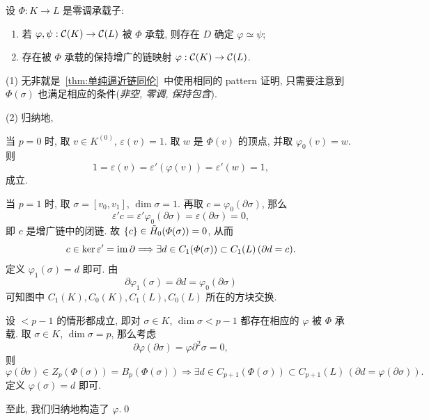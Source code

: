 \begin{Proposition}[零调承载子定理]\label{prop:零调承载子定理}
	设 $ \varPhi : K\to L $ 是零调承载子:
	\begin{enumerate}
		\item 若 $ \varphi,\psi : \mathcal{C}(K)\to\mathcal{C}(L) $ 被 $ \varPhi $ 承载, 则存在 $ D $ 确定 $ \varphi\simeq\psi $;
		\item 存在被 $ \varPhi $ 承载的保持增广的链映射 $ \varphi : \mathcal{C}(K)\to \mathcal{C}(L) $.
	\end{enumerate}
\end{Proposition}
\begin{Proof}
	(1) 无非就是~\ref{thm:单纯逼近链同伦}~中使用相同的 pattern 证明, 只需要注意到 $ \varPhi(\sigma) $ 也满足相应的条件(\textit{非空, 零调, 保持包含}).

	(2) 归纳地, 
	\begin{center}
	\end{center}
	当 $ p=0 $ 时, 取 $ v\in K^{(0)} $, $ \varepsilon(v)=1 $. 取 $ w $ 是 $ \varPhi(v) $ 的顶点, 并取 $ \varphi_0(v)=w $. 则
	\[
		1=\varepsilon(v)=\varepsilon'(\varphi(v))=\varepsilon'(w)=1,
	\]
	成立.

	当 $ p=1 $ 时, 取 $ \sigma=[v_0,v_1] $, $ \dim\sigma=1 $. 再取 $ c=\varphi_0(\partial\sigma) $, 那么
	\[
		\varepsilon'c=\varepsilon'\varphi_0(\partial\sigma)=\varepsilon(\partial\sigma)=0,
	\]
	即 $ c $ 是增广链中的闭链. 故 $ \left\{ c \right\}\in\tilde{H}_0(\varPhi(\sigma))=0 $, 从而
	\[
		c\in\ker\varepsilon'=\mathrm{im}\,\partial\Longrightarrow\exists d\in C_1(\varPhi(\sigma))\subset C_1(L)\,(\partial d=c).
	\]
	定义 $ \varphi_1(\sigma)=d $ 即可. 由
	\[
		\partial\varphi_1(\sigma)=\partial d=\varphi_0(\partial\sigma)
	\]
	可知图中 $ C_1(K), C_0(K), C_1(L), C_0(L) $ 所在的方块交换.

	设 $ <p-1 $ 的情形都成立, 即对 $ \sigma\in K $, $ \dim\sigma<p-1 $ 都存在相应的 $ \varphi $ 被 $ \varPhi $ 承载. 取 $ \sigma\in K $, $ \dim\sigma=p $, 那么考虑
	\[
		\partial\varphi(\partial\sigma)=\varphi\partial^2\sigma=0,
	\]
	则
	\[
		\varphi(\partial\sigma)\in Z_p(\varPhi(\sigma))=B_p(\varPhi(\sigma))\Longrightarrow\exists d\in C_{p+1}(\varPhi(\sigma))\subset C_{p+1}(L)\,(\partial d=\varphi(\partial\sigma)).
	\]
	定义 $ \varphi(\sigma)=d $ 即可.
	
	至此, 我们归纳地构造了 $ \varphi $.\qed
\end{Proof}

